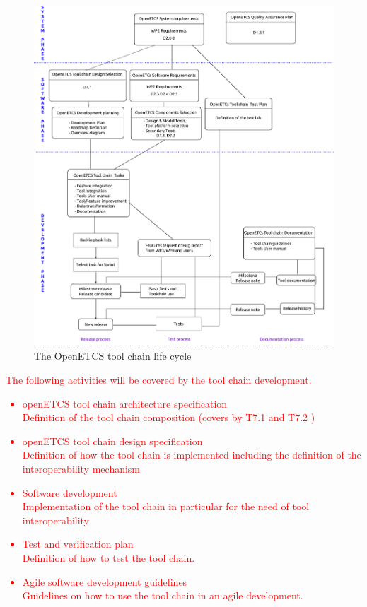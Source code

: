 \documentclass{template/openetcs_article}
\begin{document}
\begin{figure}[H]
\centering
  \includegraphics[width= \textwidth]{./figures/toolchain_lifecycle}
  \caption{The OpenETCS tool chain life cycle}
  \label{fig:TC_lifecycle}
\end{figure}


\textcolor{red}{The following activities will be covered  by the tool chain development.
\begin{itemize}
\item openETCS tool chain architecture specification\\
Definition of the tool chain composition (covers by T7.1 \cite{D7.1}
and T7.2 \cite{D7.2})
\item openETCS tool chain design specification \\
Definition of how the tool chain is implemented including the
definition of the interoperability mechanism
\item Software development\\
Implementation of the tool chain in particular for the need of tool interoperability
\item Test and verification plan\\
Definition of how to test the tool chain.
\item Agile software development guidelines\\
Guidelines on how to use the tool chain in an agile development.
\end{itemize}}
\end{document}
